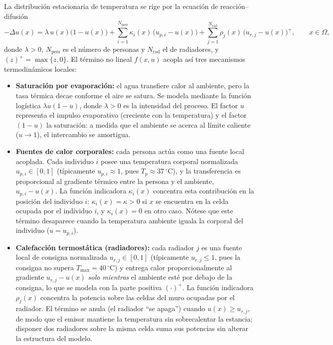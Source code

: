 La distribución estacionaria de temperatura se rige por la ecuación de
reacción--difusión
\begin{equation}\label{eq:piscina_modelo}
  -\Delta u(x) = \lambda\, u(x)\bigl(1 - u(x)\bigr)
  + \sum_{i=1}^{N_{\mathrm{pers}}} \kappa_i(x)\,\bigl(u_{p,i} - u(x)\bigr)
  + \sum_{j=1}^{N_{\mathrm{rad}}} \rho_j(x)\,
    \bigl(u_{r,j} - u(x)\bigr)^{+},
  \qquad x \in \Omega,
\end{equation}
donde $\lambda > 0$, $N_{\mathrm{pers}}$ es el número de personas y
$N_{\mathrm{rad}}$ el de radiadores, y $(z)^{+} = \max\{z,0\}$. El término no
lineal $f(x,u)$ acopla así tres mecanismos termodinámicos locales:

\begin{itemize}
  \item \textbf{Saturación por evaporación:} el agua transfiere calor al
  ambiente, pero la tasa térmica decae conforme el aire se satura. Se modela
  mediante la función logística $\lambda u(1-u)$, donde $\lambda > 0$ es la
  intensidad del proceso. El factor $u$ representa el impulso evaporativo
  (creciente con la temperatura) y el factor $(1-u)$ la saturación: a medida que
  el ambiente se acerca al límite caliente ($u \to 1$), el intercambio se
  amortigua.

  \item \textbf{Fuentes de calor corporales:} cada persona actúa como una fuente
  local acoplada. Cada individuo $i$ posee una temperatura corporal normalizada
  $u_{p,i} \in [0,1]$ (típicamente $u_{p,i} \approx 1$, pues
  $T_{p} \approx 37\,^{\circ}\mathrm{C}$), y la transferencia es proporcional al
  gradiente térmico entre la persona y el ambiente, $u_{p,i} - u(x)$. La función
  indicadora $\kappa_i(x)$ concentra esta contribución en la posición del
  individuo $i$: $\kappa_i(x) = \kappa > 0$ si $x$ se encuentra en la celda
  ocupada por el individuo $i$, y $\kappa_i(x) = 0$ en otro caso. Nótese que este
  término desaparece cuando la temperatura ambiente iguala la corporal del
  individuo ($u = u_{p,i}$).

  \item \textbf{Calefacción termostática (radiadores):} cada radiador $j$ es una
  fuente local de consigna normalizada $u_{r,j} \in [0,1]$ (típicamente
  $u_{r,j} \le 1$, pues la consigna no supera $T_{\max} = 40\,^{\circ}$C) y
  entrega calor proporcionalmente al gradiente $u_{r,j} - u(x)$ \emph{solo
  mientras} el ambiente esté por debajo de la consigna, lo que se modela con la
  parte positiva $(\cdot)^{+}$. La función indicadora $\rho_j(x)$ concentra la
  potencia sobre las celdas del muro ocupadas por el radiador. El término se
  anula (el radiador ``se apaga'') cuando $u(x) \ge u_{r,j}$, de modo que el
  emisor mantiene la temperatura sin sobrecalentar la estancia; disponer dos
  radiadores sobre la misma celda suma sus potencias sin alterar la estructura
  del modelo.


\end{itemize}
